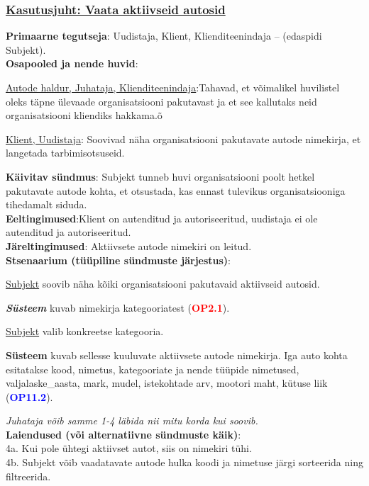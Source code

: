 \begin{shaded}
	\subsubsection{\underline{Kasutusjuht: Vaata aktiivseid autosid}}
	\textbf{Primaarne tegutseja}: Uudistaja, Klient, Klienditeenindaja – (edaspidi Subjekt). \\
	\textbf{Osapooled ja nende huvid}: 
	\useDash
	\begin{myitemize}
		\item \underline{Autode haldur, Juhataja, Klienditeenindaja}:Tahavad, et võimalikel huvilistel oleks täpne ülevaade organisatsiooni pakutavast ja et see kallutaks neid organisatsiooni kliendiks hakkama.õ
		\item \underline{Klient, Uudistaja}: Soovivad näha organisatsiooni pakutavate autode nimekirja, et langetada tarbimisotsuseid.
	\end{myitemize}
	\textbf{Käivitav sündmus}: Subjekt tunneb huvi organisatsiooni poolt hetkel pakutavate autode kohta, et otsustada, kas ennast tulevikus organisatsiooniga tihedamalt siduda. \\
	\textbf{Eeltingimused}:Klient on autenditud ja autoriseeritud, uudistaja ei ole autenditud ja autoriseeritud.\\
	\textbf{Järeltingimused}: Aktiivsete autode nimekiri on leitud. \\
	\textbf{Stsenaarium (tüüpiline sündmuste järjestus)}:
	\begin{myenumerate}
		\item \underline{Subjekt} soovib näha kõiki organisatsiooni pakutavaid aktiivseid autosid.
		\item\textit \textbf{Süsteem} kuvab nimekirja kategooriatest (\textbf{\textcolor{red}{OP2.1}}).
		\item \underline{Subjekt} valib konkreetse kategooria.
		\item \textbf{Süsteem} kuvab sellesse kuuluvate aktiivsete autode nimekirja. Iga auto kohta esitatakse kood, nimetus, kategooriate ja nende tüüpide nimetused, valjalaske\_aasta, mark, mudel, istekohtade arv, mootori maht, kütuse liik  (\textbf{\textcolor{blue}{OP11.2}}).
	\end{myenumerate}
	\textit{Juhataja võib samme 1-4 läbida nii mitu korda kui soovib. }\\
	\textbf{Laiendused  (või alternatiivne sündmuste käik)}: \\
	\indent 4a. Kui pole ühtegi aktiivset autot, siis on nimekiri tühi. \\
	\indent 4b. Subjekt võib vaadatavate autode hulka koodi ja nimetuse järgi sorteerida ning filtreerida.
\end{shaded}